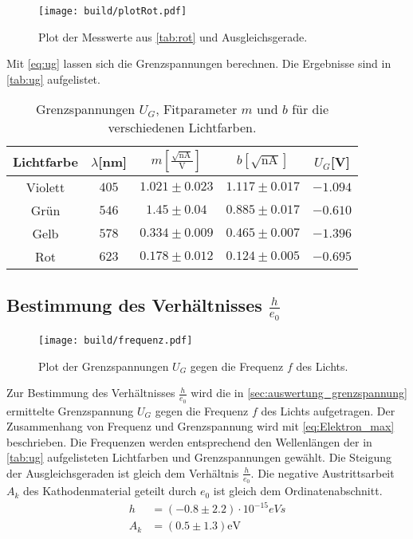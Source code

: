 \begin{figure}[H]
  \centering
  \texttt{[image: build/plotRot.pdf]}
  \caption{Plot der Messwerte aus \autoref{tab:rot} und Ausgleichsgerade.}
  \label{fig:plot_rot}
\end{figure}

Mit \autoref{eq:ug} lassen sich die Grenzspannungen berechnen. Die Ergebnisse sind in \autoref{tab:ug} aufgelistet.
\begin{table}
  \centering
  \begin{tabular}{|c|c|c|c|c|}
    \toprule
    Lichtfarbe & $λ$[nm] & $m[\frac{\sqrt{\text{nA}}}{\text{V}}]$ & $b[\sqrt{\text{nA}}]$ & $U_G$[V]\\
    \midrule
    Violett & $405$ & $1.021\pm 0.023$ & $1.117\pm 0.017$ & $-1.094$\\
    Grün & $546$ & $1.45\pm 0.04$ & $0.885\pm 0.017$ & $-0.610$\\
    Gelb & $578$ & $0.334\pm 0.009$ & $0.465\pm 0.007$ & $-1.396$\\
    Rot & $623$ & $0.178\pm 0.012$ & $0.124\pm 0.005$ & $-0.695$\\
    \bottomrule
  \end{tabular}
  \caption{Grenzspannungen $U_G$, Fitparameter $m$ und $b$ für die verschiedenen Lichtfarben.}
  \label{tab:ug}
\end{table}

\newpage

\subsection{Bestimmung des Verhältnisses $\frac{h}{e_0}$}

\begin{figure}
  \centering
  \texttt{[image: build/frequenz.pdf]}
  \caption{Plot der Grenzspannungen $U_G$ gegen die Frequenz $f$ des Lichts.}
  \label{fig:frequenz}
\end{figure}

Zur Bestimmung des Verhältnisses $\frac{h}{e_0}$ wird die in \autoref{sec:auswertung_grenzspannung} ermittelte Grenzspannung $U_G$
gegen die Frequenz $f$ des Lichts aufgetragen. 
Der Zusammenhang von Frequenz und Grenzspannung wird mit \autoref{eq:Elektron_max} beschrieben.
Die Frequenzen werden entsprechend den Wellenlängen der in \autoref{tab:ug} aufgelisteten
Lichtfarben und Grenzspannungen gewählt. Die Steigung der Ausgleichsgeraden ist gleich dem Verhältnis $\frac{h}{e_0}$.
Die negative Austrittsarbeit $A_k$ des Kathodenmaterial geteilt durch $e_0$ ist gleich dem Ordinatenabschnitt.
\begin{align}
  h &= (-0.8\pm 2.2) \cdot 10^{-15} \si{eVs} \\
  A_k &= (0.5\pm 1.3) \si{\eV}
\end{align}

